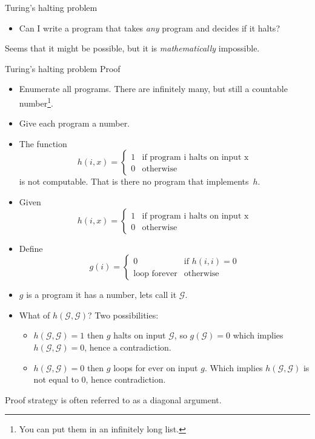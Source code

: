 \documentclass[handout]{beamer}
\begin{document}
\begin{frame}{Turing's halting problem}
  \begin{itemize}
  \item Can I write  a program that takes {\em any} program and
    decides if it halts?
  \end{itemize}
  Seems that it might be possible, but it is {\it mathematically} impossible.

 
\end{frame}
\begin{frame}{Turing's halting problem}
Proof
  \begin{itemize}
  \item  Enumerate all programs. There are infinitely many, but still
    a countable number\footnote{You can put them in an infinitely long list.}.
  \item Give each program a number. 
  \item The function
    \[
      h(i,x) = \begin{cases}
               1 & \text{if program i halts on input x} \\
               0 & \text{otherwise}
               \end{cases}
    \]
is not computable. That is there no program that implements~$h$. 
  \end{itemize}
\end{frame}
\begin{frame}
  \begin{itemize}
  \item   Given
    \[
      h(i,x) = \begin{cases}
               1 & \text{if program i halts on input x} \\
               0 & \text{otherwise}
               \end{cases}
    \]
  \item Define
    \[
    g(i) = \begin{cases}
             0 & \text{if $h(i,i) = 0$} \\
             \text{loop forever} & \text{otherwise}
           \end{cases}
    \]
\item $g$ is a program it has a number, lets call it $\mathcal{G}$.
\item What of $h(\mathcal{G},\mathcal{G})$? Two possibilities:
  \begin{itemize}
  \item  $h(\mathcal{G},\mathcal{G}) = 1$ \pause then $g$ halts on input $\mathcal{G}$, so $g(\mathcal{G})=0$ which
    implies $h(\mathcal{G},\mathcal{G}) =  0$, hence a contradiction. \pause
  \item $h(\mathcal{G},\mathcal{G}) = 0$ \pause then $g$ loops for ever on input $g$. Which implies
    $h(\mathcal{G},\mathcal{G})$ is not equal to 0, hence contradiction.
  \end{itemize}
  \end{itemize}
Proof strategy is often referred to as a diagonal argument. 
\end{frame}
\end{document}
